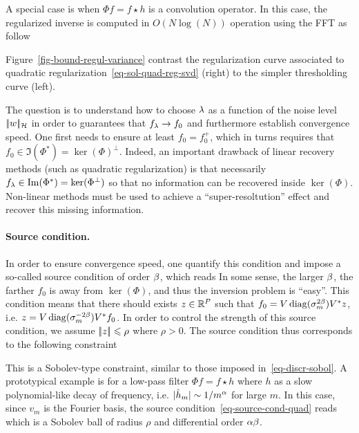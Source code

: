 A special case is when $\Phi f = f \star h$ is a convolution operator. In this case, the regularized inverse is computed in $O(N \log(N))$ operation using the FFT as follow

Figure~\ref{fig-bound-regul-variance} contrast the regularization curve associated to quadratic regularization~\eqref{eq-sol-quad-reg-svd} (right) to the simpler thresholding curve (left). 

The question is to understand how to choose $\lambda$ as a function of the noise level $|\!| w |\!|_{\mathcal{H}}$ in order to guarantees that $f_\lambda \rightarrow f_0$ and furthermore establish convergence speed. One first needs to ensure at least $f_0=f_0^+$, which in turns requires that $f_0 \in \Im(\Phi^*)=\ker(\Phi)^\bot$. Indeed, an important drawback of linear recovery methods (such as quadratic regularization) is that necessarily $f_\lambda \in \operatorname{Im}(\Phi^*)=\ker(\Phi^\bot)$ so that no information can be recovered inside $\ker(\Phi)$. Non-linear methods must be used to achieve a ``super-resoltution'' effect and recover this missing information.

\paragraph{Source condition.}

In order to ensure convergence speed, one quantify this condition and impose a so-called source condition of order $\beta$, which reads
In some sense, the larger $\beta$, the farther $f_0$ is away from $\ker(\Phi)$, and thus the inversion problem is ``easy''. 
This condition means that there should exists $z \in \mathbb{R}^P$ such that $f_0 = V \operatorname{diag}( \sigma_m^{2\beta} ) V^* z$, i.e. $z =V \operatorname{diag}( \sigma_m^{-2\beta} ) V^* f_0$. In order to control the strength of this source condition, we assume $|\!| z |\!| \leqslant \rho$ where $\rho>0$. The source condition thus corresponds to the following constraint


This is a Sobolev-type constraint, similar to those imposed in~\ref{eq-discr-sobol}. A prototypical example is for a low-pass filter $\Phi f = f \star h$ where $h$ as a slow polynomial-like decay of frequency, i.e. $|\hat h_m| \sim 1/m^{\alpha}$ for large $m$. In this case, since $v_m$ is the Fourier basis, the source condition~\eqref{eq-source-cond-quad} reads
which is a Sobolev ball of radius $\rho$ and differential order $\alpha\beta$. 


